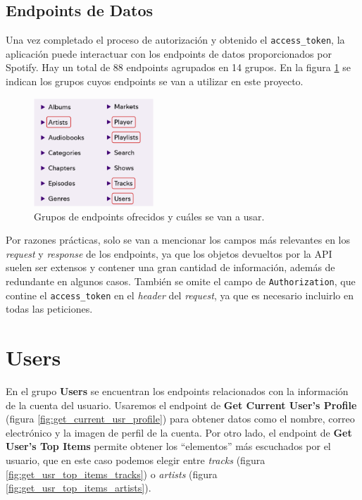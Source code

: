 \subsection{Endpoints de Datos}

Una vez completado el proceso de autorización y obtenido el \texttt{access\_token}, la aplicación puede interactuar con los endpoints de datos proporcionados por Spotify. Hay un total de 88 endpoints agrupados en 14 grupos. En la figura \ref{fig:selected_groups} se indican los grupos cuyos endpoints se van a utilizar en este proyecto.

\begin{figure}[H]
    \centering
    \includegraphics[width=0.4\textwidth]{figures/all_groups.png}
    \caption{Grupos de endpoints ofrecidos y cuáles se van a usar.}
    \label{fig:selected_groups}
\end{figure}

Por razones prácticas, solo se van a mencionar los campos más relevantes en los \textit{request} y \textit{response} de los endpoints, ya que los objetos devueltos por la API suelen ser extensos y contener una gran cantidad de información, además de redundante en algunos casos. También se omite el campo de \texttt{Authorization}, que contine el \texttt{access\_token} en el \textit{header} del \textit{request}, ya que es necesario incluirlo en todas las peticiones.

\section*{Users}

En el grupo \textbf{Users} se encuentran los endpoints relacionados con la información de la cuenta del usuario. Usaremos el endpoint de \textbf{Get Current User's Profile} (figura \ref{fig:get_current_usr_profile}) para obtener datos como el nombre, correo electrónico y la imagen de perfil de la cuenta. Por otro lado, el endpoint de \textbf{Get User's Top Items} permite obtener los ``elementos'' más escuchados por el usuario, que en este caso podemos elegir entre \textit{tracks} (figura \ref{fig:get_usr_top_items_tracks}) o \textit{artists} (figura \ref{fig:get_usr_top_items_artists}).


